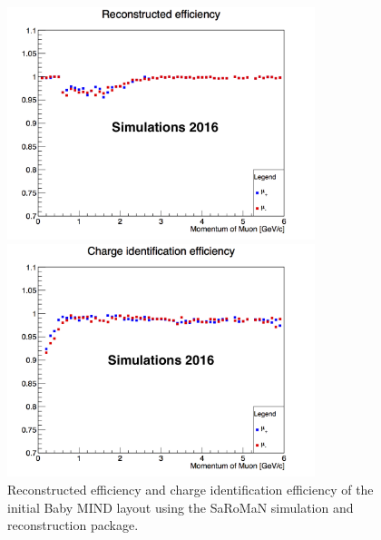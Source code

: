 \begin{figure}[h!]
\centering
\includegraphics[width=0.8\textwidth]{figures/oldStudies/oldRecEff.png}

\includegraphics[width=0.8\textwidth]{figures/oldStudies/oldChargeID.png}
\caption{Reconstructed efficiency and charge identification efficiency of the initial Baby MIND layout using the SaRoMaN simulation and reconstruction package.}
\label{fig:oldMIND2}
\end{figure}

